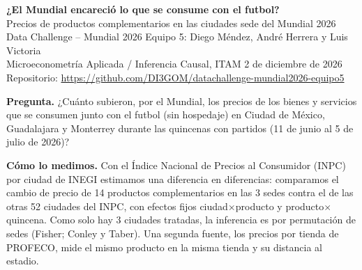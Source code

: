 \documentclass[11pt,letterpaper]{article}
\newcommand{\seccion}[1]{\vspace{4pt}{\large\bfseries #1}\par\vspace{1pt}}
\begin{document}
\begin{center}
{\LARGE\bfseries ¿El Mundial encareció lo que se consume con el futbol?}\\[3pt]
{\large Precios de productos complementarios en las ciudades sede del Mundial 2026}\\[5pt]
Data Challenge -- Mundial 2026 \textbullet{} Equipo 5: Diego Méndez, André Herrera y Luis Victoria\\
Microeconometría Aplicada / Inferencia Causal, ITAM \textbullet{} 2 de diciembre de 2026\\
Repositorio: \url{https://github.com/DI3GOM/datachallenge-mundial2026-equipo5}
\end{center}

\vspace{4pt}
\seccion{Resumen ejecutivo}

\textbf{Pregunta.} ¿Cuánto subieron, por el Mundial, los precios de los bienes y servicios que
se consumen junto con el futbol (sin hospedaje) en Ciudad de México, Guadalajara y Monterrey
durante las quincenas con partidos (11 de junio al 5 de julio de 2026)?

\textbf{Cómo lo medimos.} Con el Índice Nacional de Precios al Consumidor (INPC) por ciudad de
INEGI estimamos una diferencia en diferencias: comparamos el cambio de precio de 14 productos
complementarios en las 3 sedes contra el de las otras 52 ciudades del INPC, con efectos fijos
ciudad$\times$producto y producto$\times$quincena. Como solo hay 3 ciudades tratadas, la
inferencia es por permutación de sedes (Fisher; Conley y Taber). Una segunda fuente, los precios
por tienda de PROFECO, mide el mismo producto en la misma tienda y su distancia al estadio.
\end{document}
